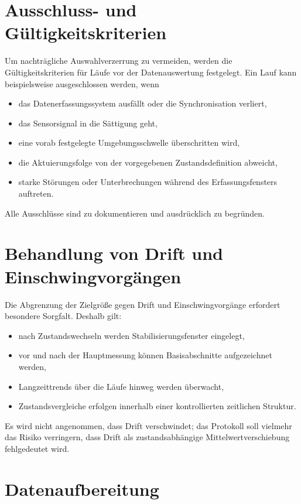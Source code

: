 \documentclass[12pt,a4paper]{report}
\begin{document}
\section{Ausschluss- und Gültigkeitskriterien}

Um nachträgliche Auswahlverzerrung zu vermeiden, werden die
Gültigkeitskriterien für Läufe vor der Datenauswertung festgelegt. Ein
Lauf kann beispielsweise ausgeschlossen werden, wenn

\begin{itemize}
\item das Datenerfassungssystem ausfällt oder die Synchronisation
      verliert,
\item das Sensorsignal in die Sättigung geht,
\item eine vorab festgelegte Umgebungsschwelle überschritten wird,
\item die Aktuierungsfolge von der vorgegebenen Zustandsdefinition
      abweicht,
\item starke Störungen oder Unterbrechungen während des
      Erfassungsfensters auftreten.
\end{itemize}

Alle Ausschlüsse sind zu dokumentieren und ausdrücklich zu begründen.

\section{Behandlung von Drift und Einschwingvorgängen}

Die Abgrenzung der Zielgröße gegen Drift und Einschwingvorgänge
erfordert besondere Sorgfalt. Deshalb gilt:

\begin{itemize}
\item nach Zustandswechseln werden Stabilisierungsfenster eingelegt,
\item vor und nach der Hauptmessung können Basisabschnitte aufgezeichnet
      werden,
\item Langzeittrends über die Läufe hinweg werden überwacht,
\item Zustandsvergleiche erfolgen innerhalb einer kontrollierten
      zeitlichen Struktur.
\end{itemize}

Es wird nicht angenommen, dass Drift verschwindet; das Protokoll soll
vielmehr das Risiko verringern, dass Drift als zustandsabhängige
Mittelwertverschiebung fehlgedeutet wird.

\section{Datenaufbereitung}
\end{document}
